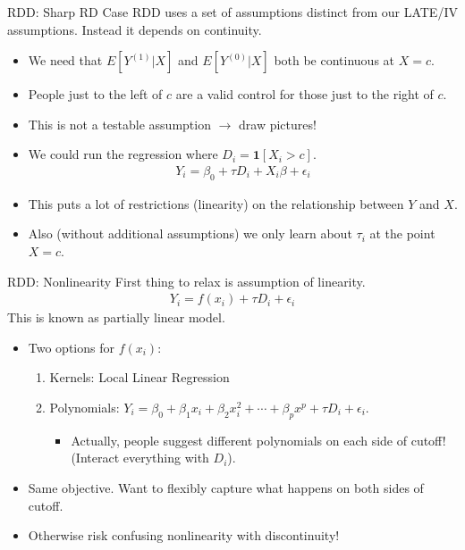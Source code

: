 \begin{frame}{RDD: Sharp RD Case}
RDD uses a set of assumptions distinct from our LATE/IV assumptions. Instead it depends on \alert{continuity}.
\begin{itemize}
\item We need that $E[Y^{(1)} | X]$ and $E[Y^{(0)} | X]$ both be continuous at $X=c$.
\item People just to the left of $c$ are a valid control for those just to the right of $c$.
\item \alert{This is not a testable assumption} $\rightarrow$ draw pictures!
\item We could run the regression where $D_i = \mathbf{1}[X_i > c]$.
\begin{eqnarray*}
Y_i = \beta_0 + \tau D_i + X_i \beta + \epsilon_i
\end{eqnarray*}
\item This puts a lot of restrictions (linearity) on the relationship between $Y$ and $X$.
\item Also (without additional assumptions) we only learn about $\tau_i$ at the point $X=c$.
\end{itemize}
\end{frame}


\begin{frame}{RDD: Nonlinearity}
First thing to relax is assumption of linearity.
\begin{eqnarray*}
Y_i = f(x_i) + \tau D_i  + \epsilon_i
\end{eqnarray*}
This is known as \alert{partially linear model}.
\begin{itemize}
\item Two options for $f(x_i)$:
\begin{enumerate}
\item Kernels: Local Linear Regression
\item Polynomials: $Y_i = \beta_0 + \beta_1 x_i + \beta_2 x_i^2 + \cdots + \beta_p x^p + \tau D_i + \epsilon_i$.
\begin{itemize}
\item Actually, people suggest different polynomials on each side of cutoff! (Interact everything with $D_i$).
\end{itemize}
\end{enumerate}
\item Same objective. Want to flexibly capture what happens on both sides of cutoff.
\item Otherwise risk confusing nonlinearity with discontinuity!
\end{itemize}
\end{frame}
	
